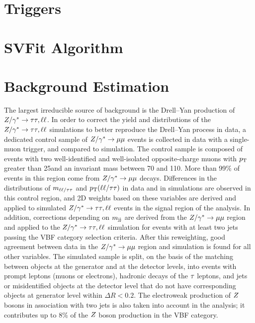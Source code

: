 \section{Triggers}
\section{SVFit Algorithm}
\section{Background Estimation}
The largest irreducible source of background is the Drell--Yan production
of $Z/\gamma^*\to\tau\tau, \ell\ell$.
In order to correct the yield and distributions of the $Z/\gamma^*\to\tau\tau, \ell\ell$ simulations to better reproduce the Drell--Yan process in data, a dedicated control sample of $Z/\gamma^*\to\mu\mu$
events is collected in data with a single-muon trigger, and compared to simulation. The control sample is composed of events with two well-identified
and well-isolated opposite-charge muons with $p_\mathrm{T}$ greater than 25\GeV and an invariant mass between 70 and 110\GeV.
More than 99\% of events in this region come from $Z/\gamma^*\to\mu\mu$ decays.
Differences in the distributions of $m_{\ell\ell/\tau\tau}$ and $p_\mathrm{T}(\ell\ell/\tau\tau)$ in data and in simulations are observed in this control region, and 2D weights based on these variables are derived and applied to simulated $Z/\gamma^*\to\tau\tau, \ell\ell$ events in the signal region of the analysis. In addition, corrections depending on $m_\mathrm{jj}$ are derived from the $Z/\gamma^*\to\mu\mu$ region and applied to the $Z/\gamma^*\to\tau\tau, \ell\ell$ simulation for events with at least two jets passing the VBF category selection criteria. After this reweighting, good agreement between data in the $Z/\gamma^*\to\mu\mu$ region and simulation is found for all other variables.
The simulated sample is split, on the basis of the matching between objects at the generator and at the detector levels,
into events with prompt leptons (muons or electrons), hadronic decays of the $\tau$ leptons,
and jets or misidentified objects at the detector level that do not have corresponding objects
at generator level within $\Delta R < 0.2$.
The electroweak production of $Z$ bosons in association with two jets is also taken into account in the analysis; it
contributes up to 8\% of the $Z$ boson production in the VBF category.

